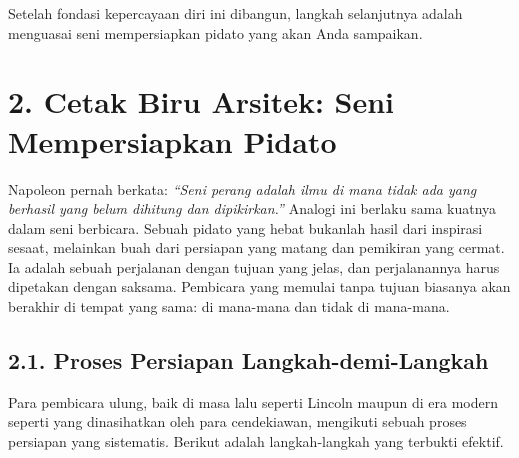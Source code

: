 \documentclass[
  letterpaper,
  DIV=11,
  numbers=noendperiod]{scrreprt}
\begin{document}
Setelah fondasi kepercayaan diri ini dibangun, langkah selanjutnya
adalah menguasai seni mempersiapkan pidato yang akan Anda sampaikan.


\chapter{2. Cetak Biru Arsitek: Seni Mempersiapkan
Pidato}\label{cetak-biru-arsitek-seni-mempersiapkan-pidato}

Napoleon pernah berkata: \emph{``Seni perang adalah ilmu di mana tidak
ada yang berhasil yang belum dihitung dan dipikirkan.''} Analogi ini
berlaku sama kuatnya dalam seni berbicara. Sebuah pidato yang hebat
bukanlah hasil dari inspirasi sesaat, melainkan buah dari persiapan yang
matang dan pemikiran yang cermat. Ia adalah sebuah perjalanan dengan
tujuan yang jelas, dan perjalanannya harus dipetakan dengan saksama.
Pembicara yang memulai tanpa tujuan biasanya akan berakhir di tempat
yang sama: di mana-mana dan tidak di mana-mana.

\section{\texorpdfstring{\textbf{2.1. Proses Persiapan
Langkah-demi-Langkah}}{2.1. Proses Persiapan Langkah-demi-Langkah}}\label{proses-persiapan-langkah-demi-langkah}

Para pembicara ulung, baik di masa lalu seperti Lincoln maupun di era
modern seperti yang dinasihatkan oleh para cendekiawan, mengikuti sebuah
proses persiapan yang sistematis. Berikut adalah langkah-langkah yang
terbukti efektif.
\end{document}
